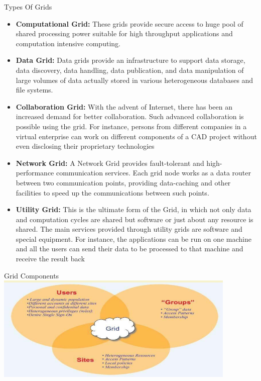\documentclass{SKP-beamer}
\begin{document}
\begin{frame}{ Types Of Grids}
	\begin{itemize}
		
		\item  \textbf{Computational Grid:} These grids provide secure access to huge pool of shared processing 
		power suitable for high throughput applications and computation intensive computing.
		\item \textbf{Data Grid:} Data grids provide an infrastructure to support data storage, data discovery, data 
		handling, data publication, and data manipulation of large volumes of data actually stored 
		in various heterogeneous databases and file systems.
		\item  \textbf{Collaboration Grid:} With the advent of Internet, there has been an increased demand for 
		better collaboration. Such advanced collaboration is possible using the grid. For instance, 
		persons from different companies in a virtual enterprise can work on different components of 
		a CAD project without even disclosing their proprietary technologies
		
	\end{itemize}
\end{frame}

\begin{frame}{}
	\begin{itemize}
		
		\item \textbf{Network Grid:} A Network Grid provides fault-tolerant and high-performance communication 
		services. Each grid node works as a data router between two communication points, 
		providing data-caching and other facilities to speed up the communications between such 
		points.
		
		\item  \textbf{Utility Grid:} This is the ultimate form of the Grid, in which not only data and computation 
		cycles are shared but software or just about any resource is shared. The main services 
		provided through utility grids are software and special equipment. For instance, the 
		applications can be run on one machine and all the users can send their data to be 
		processed to that machine and receive the result back
		
	\end{itemize}
\end{frame}

\begin{frame}{Grid Components}
	\includegraphics[scale=1.2]{6.png}
\end{frame}
\end{document}
